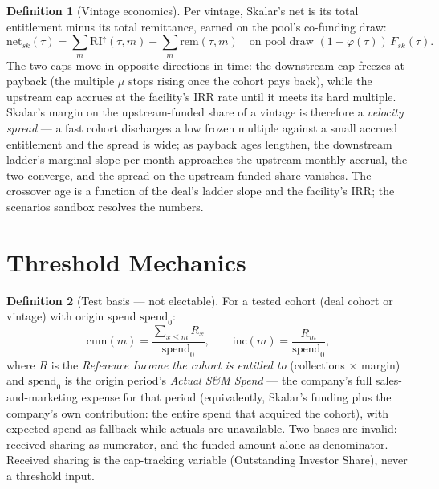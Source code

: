 \documentclass[11pt, a4paper]{article}
\theoremstyle{definition}
\newtheorem{definition}{Definition}[section]
\newcommand{\src}[1]{}
\newcommand{\KCIA}{downstream agreement}
\newcommand{\RIup}{\mathrm{RI}^{\uparrow}}        %
\newcommand{\rem}{\mathrm{rem}}                   %
\newcommand{\spend}{\mathrm{spend}}               %
\newcommand{\cum}{\mathrm{cum}}
\newcommand{\inc}{\mathrm{inc}}
\begin{document}
\begin{definition}[Vintage economics]\label{def:econ}
Per vintage, Skalar's net is its total entitlement minus its total remittance, earned on the pool's co-funding draw:
\[
\mathrm{net}_{sk}(\tau) = \sum_m \RIup(\tau, m) - \sum_m \rem(\tau, m)
\quad \text{on pool draw } (1 - \varphi(\tau))\, F_{sk}(\tau).
\]
The two caps move in opposite directions in time: the downstream cap freezes at payback (the multiple $\mu$ stops rising once the cohort pays back), while the upstream cap accrues at the facility's IRR rate until it meets its hard multiple. Skalar's margin on the upstream-funded share of a vintage is therefore a \emph{velocity spread} --- a fast cohort discharges a low frozen multiple against a small accrued entitlement and the spread is wide; as payback ages lengthen, the downstream ladder's marginal slope per month approaches the upstream monthly accrual, the two converge, and the spread on the upstream-funded share vanishes. The crossover age is a function of the deal's ladder slope and the facility's IRR; the scenarios sandbox resolves the numbers.
\end{definition}

\section{Threshold Mechanics}\label{sec:thresholds}

\begin{definition}[Test basis --- not electable]\label{def:basis}
For a tested cohort (deal cohort or vintage) with origin spend $\spend_0$:
\[
\cum(m) = \frac{\sum_{x \leq m} R_x}{\spend_0},
\qquad
\inc(m) = \frac{R_m}{\spend_0},
\]
where $R$ is the \emph{Reference Income the cohort is entitled to} (collections $\times$ margin) and $\spend_0$ is the origin period's \emph{Actual S\&M Spend} --- the company's full sales-and-marketing expense for that period (equivalently, Skalar's funding plus the company's own contribution: the entire spend that acquired the cohort), with expected spend as fallback while actuals are unavailable. Two bases are invalid: received sharing as numerator, and the funded amount alone as denominator. Received sharing is the cap-tracking variable (Outstanding Investor Share), never a threshold input.
\src{\KCIA{} Sch.~A (``Threshold M0''--``M3'', ``Threshold Delta M4+'', ``Cohort Threshold Test'' proviso).}
\end{definition}
\end{document}
